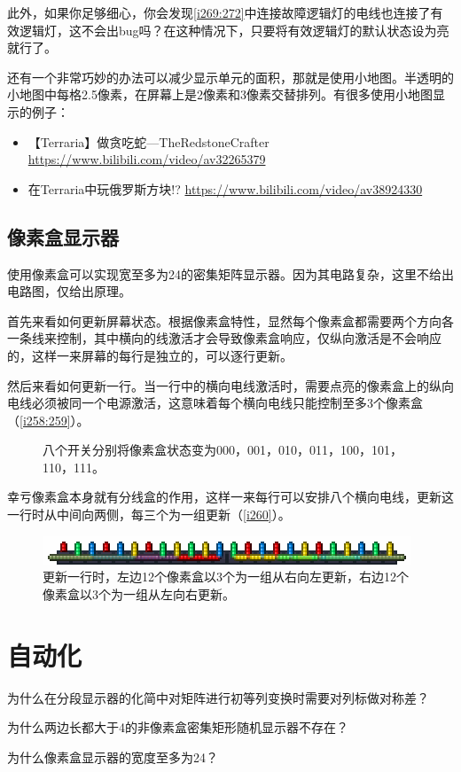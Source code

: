 此外，如果你足够细心，你会发现\autoref{i269:272}中连接故障逻辑灯的电线也连接了有效逻辑灯，这不会出bug吗？在这种情况下，只要将有效逻辑灯的默认状态设为亮就行了。

还有一个非常巧妙的办法可以减少显示单元的面积，那就是使用小地图。半透明的小地图中每格2.5像素，在屏幕上是2像素和3像素交替排列。有很多使用小地图显示的例子：
\begin{itemize}
\item 【Terraria】做贪吃蛇—TheRedstoneCrafter \url{https://www.bilibili.com/video/av32265379}
\item 在Terraria中玩俄罗斯方块!? \url{https://www.bilibili.com/video/av38924330}
\end{itemize}

\subsection{像素盒显示器}

使用像素盒可以实现宽至多为24的密集矩阵显示器。因为其电路复杂，这里不给出电路图，仅给出原理。

首先来看如何更新屏幕状态。根据像素盒特性，显然每个像素盒都需要两个方向各一条线来控制，其中横向的线激活才会导致像素盒响应，仅纵向激活是不会响应的，这样一来屏幕的每行是独立的，可以逐行更新。

然后来看如何更新一行。当一行中的横向电线激活时，需要点亮的像素盒上的纵向电线必须被同一个电源激活，这意味着每个横向电线只能控制至多3个像素盒（\autoref{i258:259}）。

\begin{figure}[!ht]
\begin{center}
\qquad
{}
\end{center}
\caption{八个开关分别将像素盒状态变为000，001，010，011，100，101，110，111。}
\label{i258:259}
\end{figure}

幸亏像素盒本身就有分线盒的作用，这样一来每行可以安排八个横向电线，更新这一行时从中间向两侧，每三个为一组更新（\autoref{i260}）。

\begin{figure}[!ht]
\centering
\includegraphics{images/260.png}
\caption{更新一行时，左边12个像素盒以3个为一组从右向左更新，右边12个像素盒以3个为一组从左向右更新。}
\label{i260}
\end{figure}

\section{自动化}

\begin{problemset}[思考题]
\item 为什么在分段显示器的化简中对矩阵进行初等列变换时需要对列标做对称差？
\item 为什么两边长都大于4的非像素盒密集矩形随机显示器不存在？
\item 为什么像素盒显示器的宽度至多为24？
\end{problemset}